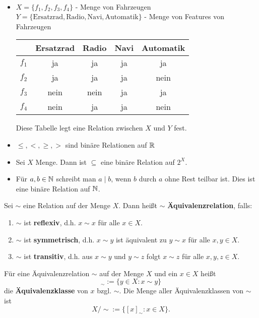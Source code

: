 \begin{bsp}\ %
\begin{itemize}
	\item $ X = \{f_1,f_2,f_3,f_4\} $ - Menge von Fahrzeugen\\
	$ Y =  \{ \text{Ersatzrad}, \text{Radio}, \text{Navi}, \text{Automatik} \}$ - Menge von Features von Fahrzeugen
	\begin{center} 
	\begin{tabular}{l|c|c|c|c}
		& Ersatzrad & Radio & Navi & Automatik \\
		\hline
		$ f_1 $ & ja & ja & ja & ja \\
		$ f_2 $ & ja & ja & ja & nein \\
		$ f_3 $ & nein & nein & ja & ja \\
		$ f_4 $ & nein & ja & ja & nein
	\end{tabular}
	\end{center}  
	Diese Tabelle legt eine Relation zwischen $X$ und $Y$ fest. 
	\item $ \leq, <, \geq, > $ sind binäre Relationen auf $ \mathbb{R}$
	\item Sei $X$ Menge. Dann ist $ \subseteq $ eine binäre Relation auf $ 2^X $.
	\item Für $ a,b \in \mathbb{N} $ schreibt man $ a \mid b $, wenn $ b $ durch $ a $ ohne Rest teilbar ist. Dies ist eine binäre Relation auf $\mathbb{N}$. 
\end{itemize}
\end{bsp}


\begin{defn}
Sei $ \sim $ eine Relation auf der Menge $ X $. Dann heißt $ \sim $ \textbf{Äquivalenz\-relation}, falls: 
\begin{enumerate}
	\item $ \sim $ ist \textbf{reflexiv}, d.h. $ x \sim x $ für alle $ x \in X $.
	\item $ \sim $ ist \textbf{symmetrisch}, d.h. $ x \sim y $ ist äquivalent zu $ y \sim x $ für alle $ x,y \in X $.
	\item $ \sim $ ist \textbf{transitiv}, d.h. aus $ x \sim y $ und $ y \sim z $ folgt $ x \sim z $ für alle $ x,y,z \in X $.
\end{enumerate}
Für eine Äquivalenzrelation $ \sim $ auf der Menge $ X $ und ein $ x \in X $ heißt
\begin{equation*}
	[x]_\sim := \{ y \in X : x \sim y \}
\end{equation*}
die \textbf{Äquivalenzklasse} von $ x $ bzgl. $ \sim $. Die Menge aller Äquivalenzklassen von $ \sim $ ist
\begin{equation*}
	X/{\sim} := \{ [x]_\sim : x \in X \}. %
\end{equation*}
\end{defn} 

